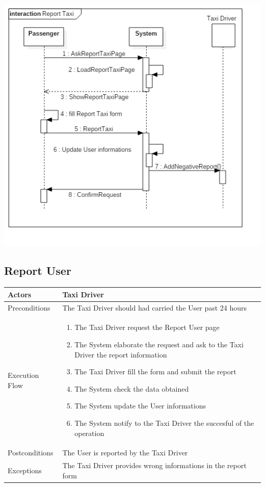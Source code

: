 \documentclass[english]{article}
\begin{document}
\includegraphics[width=\textwidth]{ReportTaxi}

\subsection{Report User}

\begin{tabular}{lp{8cm}}
\hline
Actors & Taxi Driver \\
\hline
Preconditions & The Taxi Driver should had carried the User past 24 hours \\
\hline
Execution Flow &  
		\begin{enumerate}
			\item The Taxi Driver request the Report User page
			\item The System elaborate the request and ask to the Taxi Driver the report information
			\item The Taxi Driver fill the form and submit the report
			\item The System check the data obtained
			\item The System update the User informations
			\item The System notify to the Taxi Driver the succesful of the operation
		\end{enumerate} 
	\\ 
\hline
Postconditions & The User is reported by the Taxi Driver \\
\hline
Exceptions & The Taxi Driver provides wrong informations in the report form
\end{tabular}
\end{document}
